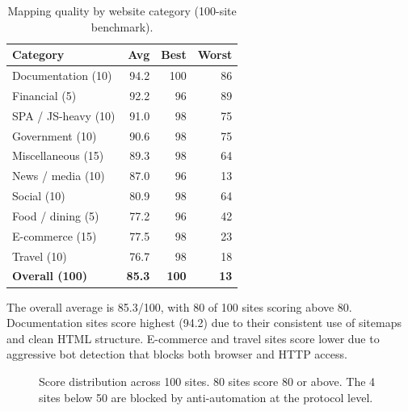 \documentclass[10pt, twocolumn]{article}
\begin{document}
\begin{table}[t]
\caption{Mapping quality by website category (100-site benchmark).}
\label{tab:categories}
\centering
\small
\begin{tabular}{@{}lrrr@{}}
\toprule
\textbf{Category} & \textbf{Avg} & \textbf{Best} & \textbf{Worst} \\
\midrule
Documentation (10) & 94.2 & 100 & 86 \\
Financial (5) & 92.2 & 96 & 89 \\
SPA / JS-heavy (10) & 91.0 & 98 & 75 \\
Government (10) & 90.6 & 98 & 75 \\
Miscellaneous (15) & 89.3 & 98 & 64 \\
News / media (10) & 87.0 & 96 & 13 \\
Social (10) & 80.9 & 98 & 64 \\
Food / dining (5) & 77.2 & 96 & 42 \\
E-commerce (15) & 77.5 & 98 & 23 \\
Travel (10) & 76.7 & 98 & 18 \\
\midrule
\textbf{Overall (100)} & \textbf{85.3} & \textbf{100} & \textbf{13} \\
\bottomrule
\end{tabular}
\end{table}

The overall average is 85.3/100, with 80 of 100 sites scoring above 80. Documentation sites score highest (94.2) due to their consistent use of sitemaps and clean HTML structure. E-commerce and travel sites score lower due to aggressive bot detection that blocks both browser and HTTP access.

\begin{figure}[t]
\centering
{}
\caption{Score distribution across 100 sites. 80 sites score 80 or above. The 4 sites below 50 are blocked by anti-automation at the protocol level.}
\label{fig:scoredist}
\end{figure}
\end{document}
